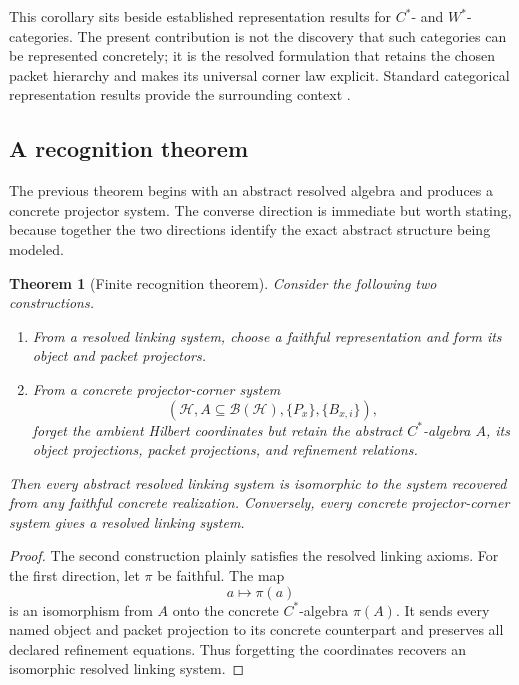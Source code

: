 \documentclass[11pt]{article}
\newtheorem{theorem}{Theorem}[section]
\theoremstyle{definition}
\theoremstyle{remark}
\begin{document}
This corollary sits beside established representation results for $C^*$- and $W^*$-categories.  The present contribution is not the discovery that such categories can be represented concretely; it is the resolved formulation that retains the chosen packet hierarchy and makes its universal corner law explicit.  Standard categorical representation results provide the surrounding context \cite{GLR1985,Heunen2009,FritzWesterbaan2020}.

\subsection{A recognition theorem}

The previous theorem begins with an abstract resolved algebra and produces a concrete projector system.  The converse direction is immediate but worth stating, because together the two directions identify the exact abstract structure being modeled.

\begin{theorem}[Finite recognition theorem]
Consider the following two constructions.
\begin{enumerate}[label=\textup{(\alph*)}]
\item From a resolved linking system, choose a faithful representation and form its object and packet projectors.
\item From a concrete projector-corner system
\[
\left(
\mathcal H,
A\subseteq\mathcal B(\mathcal H),
\{P_x\},
\{B_{x,i}\}
\right),
\]
forget the ambient Hilbert coordinates but retain the abstract $C^*$-algebra $A$, its object projections, packet projections, and refinement relations.
\end{enumerate}
Then every abstract resolved linking system is isomorphic to the system recovered from any faithful concrete realization.  Conversely, every concrete projector-corner system gives a resolved linking system.
\end{theorem}

\begin{proof}
The second construction plainly satisfies the resolved linking axioms.  For the first direction, let $\pi$ be faithful.  The map
\[
a\longmapsto\pi(a)
\]
is an isomorphism from $A$ onto the concrete $C^*$-algebra $\pi(A)$.  It sends every named object and packet projection to its concrete counterpart and preserves all declared refinement equations.  Thus forgetting the coordinates recovers an isomorphic resolved linking system.
\end{proof}
\end{document}
